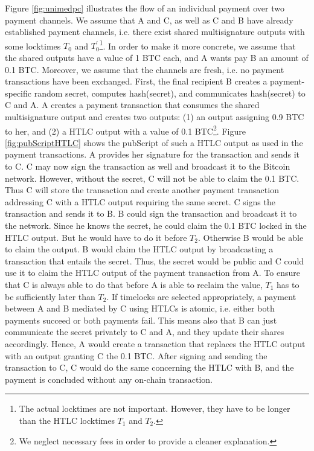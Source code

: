 Figure \ref{fig:unimedpc} illustrates the flow of an individual payment over two payment channels. We assume that A and C, as well as C and B have already established payment channels, i.e. there exist shared multisignature outputs with some locktimes $T_0$ and $T_0^{'}$\footnote{The actual locktimes are not important. However, they have to be longer than the HTLC locktimes $T_1$ and $T_2$.}. In order to make it more concrete, we assume that the shared outputs have a value of 1 BTC each, and A wants pay B an amount of 0.1 BTC. Moreover, we assume that the channels are fresh, i.e. no payment transactions have been exchanged. First, the final recipient B creates a payment-specific random secret, computes hash(secret), and communicates hash(secret) to C and A. A creates a payment transaction that consumes the shared multisignature output and creates two outputs: (1) an output assigning 0.9 BTC to her, and (2) a HTLC output with a value of 0.1 BTC\footnote{We neglect necessary fees in order to provide a cleaner explanation.}. Figure \ref{fig:pubScriptHTLC} shows the pubScript of such a HTLC output as used in the payment transactions. A provides her signature for the transaction and sends it to C. C may now sign the transaction as well and broadcast it to the Bitcoin network. However, without the secret, C will not be able to claim the 0.1 BTC. Thus C will store the transaction and create another payment transaction addressing C with a HTLC output requiring the same secret. C signs the transaction and sends it to B. B could sign the transaction and broadcast it to the network. Since he knows the secret, he could claim the 0.1 BTC locked in the HTLC output. But he would have to do it before $T_2$. Otherwise B would be able to claim the output. B would claim the HTLC output by broadcasting a transaction that entails the secret. Thus, the secret would be public and C could use it to claim the HTLC output of the payment transaction from A. To ensure that C is always able to do that before A is able to reclaim the value, $T_1$ has to be sufficiently later than $T_2$. If timelocks are selected appropriately, a payment between A and B mediated by C using HTLCs is atomic, i.e. either both payments succeed or both payments fail. This means also that B can just communicate the secret privately to C and A, and they update their shares accordingly. Hence, A would create a transaction that replaces the HTLC output with an output granting C the 0.1 BTC. After signing and sending the transaction to C, C would do the same concerning the HTLC with B, and the payment is concluded without any on-chain transaction.

